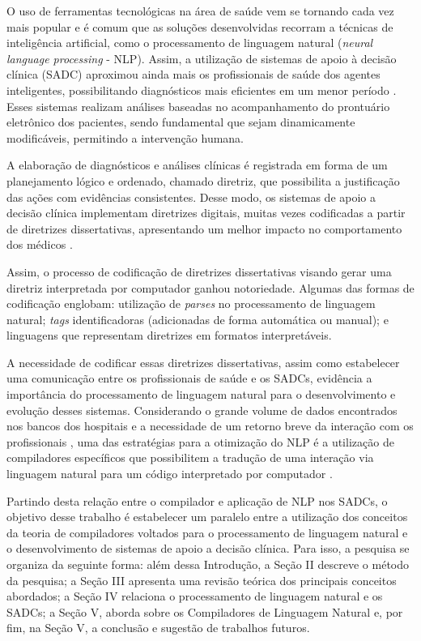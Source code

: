 \documentclass[12pt]{article}
\begin{document}
O uso de ferramentas tecnológicas na área de saúde vem se tornando cada vez mais popular e é comum que as soluções desenvolvidas recorram a técnicas de inteligência artificial, como o processamento de linguagem natural (\textit{neural language processing} - NLP). Assim, a utilização de sistemas de apoio à decisão clínica (SADC) aproximou ainda mais os profissionais de saúde dos agentes inteligentes, possibilitando diagnósticos mais eficientes em um menor período \cite{artigo_base}. Esses sistemas realizam análises baseadas no acompanhamento do prontuário eletrônico dos pacientes, sendo fundamental que sejam dinamicamente modificáveis, permitindo a intervenção humana.

A elaboração de diagnósticos e análises clínicas é registrada em forma de um planejamento lógico e ordenado, chamado diretriz, que possibilita a justificação das ações com evidências consistentes. Desse modo, os sistemas de apoio a decisão clínica implementam diretrizes digitais, muitas vezes codificadas a partir de diretrizes dissertativas, apresentando um melhor impacto no comportamento dos médicos \cite{lichtenstein2011sistemas}.

Assim, o processo de codificação de diretrizes dissertativas visando gerar uma diretriz interpretada por computador ganhou notoriedade. Algumas das formas de codificação englobam: utilização de \textit{parses} no processamento de linguagem natural; \textit{tags} identificadoras (adicionadas de forma automática ou manual); e linguagens que representam diretrizes em formatos interpretáveis.

A necessidade de codificar essas diretrizes dissertativas, assim como estabelecer uma comunicação entre os profissionais de saúde e os SADCs, evidência a importância do processamento de linguagem natural para o desenvolvimento e evolução desses sistemas. 
Considerando o grande volume de dados encontrados nos bancos dos hospitais e a necessidade de um retorno breve da interação com os profissionais \cite{artigo_base}, uma das estratégias para a otimização do NLP é a utilização de compiladores específicos que possibilitem a tradução de uma interação via linguagem natural para um código interpretado por computador \cite{NLCP}. 

Partindo desta relação entre o compilador e aplicação de NLP nos SADCs, o objetivo desse trabalho é estabelecer um paralelo entre a utilização dos conceitos da teoria de compiladores voltados para o processamento de linguagem natural e o desenvolvimento de sistemas de apoio a decisão clínica.
Para isso, a pesquisa se organiza da seguinte forma: além dessa Introdução, a Seção II descreve o método da pesquisa; a Seção III apresenta uma revisão teórica dos principais conceitos abordados; a Seção IV relaciona o processamento de linguagem natural e os SADCs; a Seção V, aborda sobre os Compiladores de Linguagem Natural e, por fim, na Seção V, a conclusão e sugestão de trabalhos futuros.
\end{document}
